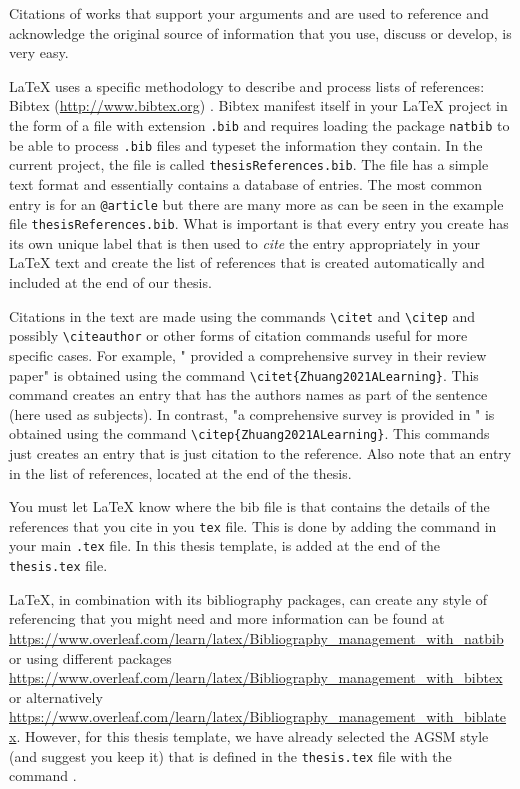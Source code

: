 \documentclass[11pt,twoside,openright]{report}
\begin{document}
Citations of works that support your arguments and are used to reference and acknowledge the original source of information that you use, discuss or develop, is very easy. 

\LaTeX{} uses a specific methodology to describe and process lists of references: Bibtex (\url{http://www.bibtex.org}) .
Bibtex manifest itself in your \LaTeX{} project in the form of a file with extension \verb|.bib| and requires loading the package \verb|natbib| to be able to process \verb|.bib| files and typeset the information they contain.
In the current project, the file is called \verb|thesisReferences.bib|.
The file has a simple text format and essentially contains a database of entries.
The most common entry is for an \verb|@article| but there are many more as can be seen in the example file \verb|thesisReferences.bib|. 
What is important is that every entry you create has its own unique label that is then used to \emph{cite} the entry appropriately in your \LaTeX{} text and create the list of references that is created automatically and included at the end of our thesis.

Citations in the text are made using the commands \verb|\citet| and \verb|\citep| and possibly \verb|\citeauthor| or other forms of citation commands useful for more specific cases.
For example, "\citet{Zhuang2021ALearning} provided a comprehensive survey in their review paper" is obtained using the command \verb|\citet{Zhuang2021ALearning}|.
This command creates an entry that has the authors names as part of the sentence (here used as subjects). 
In contrast, "a comprehensive survey is provided in \citep{Zhuang2021ALearning}" is obtained using the command \verb|\citep{Zhuang2021ALearning}|. 
This commands just creates an entry that is just citation to the reference.
Also note that an entry in the list of references, located at the end of the thesis.

You must let \LaTeX{} know where the bib file is that contains the details of the references that you cite in you \verb|tex| file.
This is done by adding the command \verb|| in your main \verb|.tex| file.
In this thesis template, \verb|| is added at the end of the \verb|thesis.tex| file.

\LaTeX{}, in combination with its bibliography packages, can create any style of referencing that you might need and more information can be found at  \url{https://www.overleaf.com/learn/latex/Bibliography_management_with_natbib} or using different packages \url{https://www.overleaf.com/learn/latex/Bibliography_management_with_bibtex} or alternatively \url{https://www.overleaf.com/learn/latex/Bibliography_management_with_biblatex}.
However, for this thesis template, we have already selected the AGSM style (and suggest you keep it) that is defined in the \verb|thesis.tex| file with the command \verb||.
\end{document}
